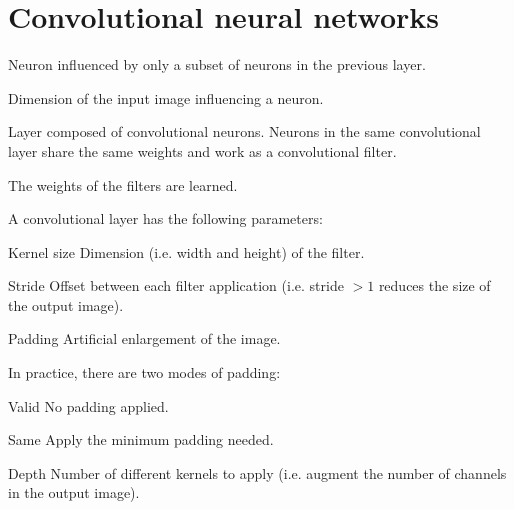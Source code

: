 \chapter{Convolutional neural networks}


\begin{description}
    \item[Convolution neuron] 
        Neuron influenced by only a subset of neurons in the previous layer.
        
    \item[Receptive field] 
        Dimension of the input image influencing a neuron.

    \item[Convolutional layer] 
        Layer composed of convolutional neurons.
        Neurons in the same convolutional layer share the same weights and work as a convolutional filter.

        \begin{remark}
            The weights of the filters are learned.
        \end{remark}

        A convolutional layer has the following parameters:
        \begin{descriptionlist}
            \item[Kernel size] 
                Dimension (i.e. width and height) of the filter.

            \item[Stride] 
                Offset between each filter application (i.e. stride $>1$ reduces the size of the output image).

            \item[Padding] 
                Artificial enlargement of the image.
                
                In practice, there are two modes of padding:
                \begin{descriptionlist}
                    \item[Valid] No padding applied.
                    \item[Same] Apply the minimum padding needed.
                \end{descriptionlist}

            \item[Depth] 
                Number of different kernels to apply (i.e. augment the number of channels in the output image).
        \end{descriptionlist}


\end{description}
